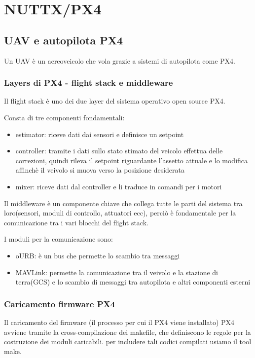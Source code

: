\documentclass{report}
\begin{document}
\chapter{NUTTX/PX4}
\section{UAV e autopilota PX4}
Un UAV è un aereoveicolo che vola grazie a sistemi di autopilota come PX4.
\subsection{Layers di PX4 - flight stack e middleware}
Il flight stack è uno dei due layer del sistema operativo open source PX4.

Consta di tre componenti fondamentali: 
\begin{itemize}
    \item estimator: riceve dati dai sensori e definisce un setpoint
    \item controller: tramite i dati sullo stato stimato del veicolo effettua delle correzioni, quindi rileva il setpoint riguardante l’assetto attuale e lo modifica affinchè il veivolo si muova verso la posizione desiderata
    \item mixer: riceve dati dal controller e li traduce in comandi per i motori
\end{itemize}

Il middleware è un componente chiave che collega tutte le parti del sistema tra loro(sensori, moduli di controllo, attuatori ecc), perciò è fondamentale per la comunicazione tra i vari blocchi del flight stack. 

I moduli per la comunicazione sono:
\begin{itemize}
    \item oURB: è un bus che permette lo scambio tra messaggi
    \item MAVLink: permette la comunicazione tra il veivolo e la stazione di terra(GCS) e lo scambio di messaggi tra autopilota e altri componenti esterni
\end{itemize}

\subsection{Caricamento firmware PX4}
Il caricamento del firmware (il processo per cui il PX4 viene installato) PX4 avviene tramite la cross-compilazione dei makefile, che definiscono le regole per la costruzione dei moduli caricabili. per includere tali codici compilati usiamo il tool make. 
\end{document}
